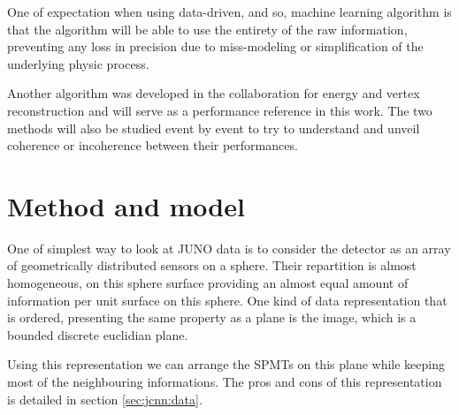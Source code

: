 One of expectation when using data-driven, and so, machine learning algorithm is that the algorithm will be able to use the entirety of the raw information, preventing any loss in precision due to miss-modeling or simplification of the underlying physic process.


Another algorithm was developed in the collaboration for energy and vertex reconstruction \cite{lebrin_towards_2022} and will serve as a performance reference in this work. The two methods will also be studied event by event to try to understand and unveil coherence or incoherence between their performances.


\section{Method and model}

One of simplest way to look at JUNO data is to consider the detector as an array of geometrically distributed sensors on a sphere. Their repartition is almost homogeneous, on this sphere surface providing an almost equal amount of information per unit surface on this sphere. One kind of data representation that is ordered, presenting the same property as a plane is the image, which is a bounded discrete euclidian plane.

Using this representation we can arrange the SPMTs on this plane while keeping most of the neighbouring informations. The pros and cons of this representation is detailed in section \ref{sec:jcnn:data}.

